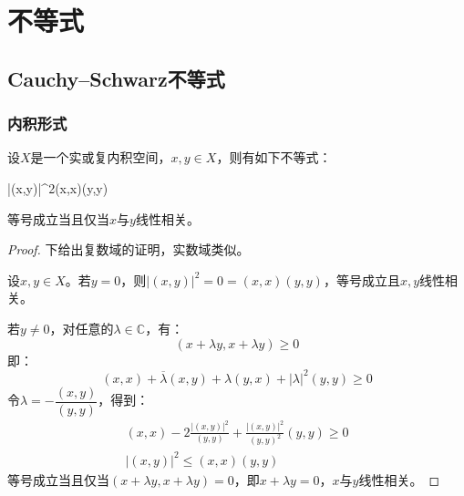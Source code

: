 \section{不等式}

\subsection{Cauchy–Schwarz不等式}
\subsubsection{内积形式}
\begin{theorem}
	设$X$是一个实或复内积空间，$x,y\in X$，则有如下不等式：
	\begin{inequality*}\label{ineq:CauchySchiwarz}
		|(x,y)|^2\leqslant(x,x)(y,y)
	\end{inequality*}
	等号成立当且仅当$x$与$y$线性相关。
\end{theorem}
\begin{proof}
	下给出复数域的证明，实数域类似。\par
	设$x,y\in X$。若$y=0$，则$|(x,y)|^2=0=(x,x)(y,y)$，等号成立且$x,y$线性相关。\par
	若$y\ne0$，对任意的$\lambda\in\mathbb{C}$，有：
	\begin{equation*}
		(x+\lambda y,x+\lambda y)\geqslant0
	\end{equation*}
	即：
	\begin{equation*}
		(x,x)+\overline{\lambda}(x,y)+\lambda(y,x)+|\lambda|^2(y,y)\geqslant0
	\end{equation*}
	令$\lambda=-\dfrac{(x,y)}{(y,y)}$，得到：
	\begin{gather*}
		(x,x)-2\frac{|(x,y)|^2}{(y,y)}+\frac{|(x,y)|^2}{(y,y)^2}(y,y)\geqslant0 \\
		|(x,y)|^2\leqslant(x,x)(y,y)
	\end{gather*}
	等号成立当且仅当$(x+\lambda y,x+\lambda y)=0$，即$x+\lambda y=0$，$x$与$y$线性相关。
\end{proof}
